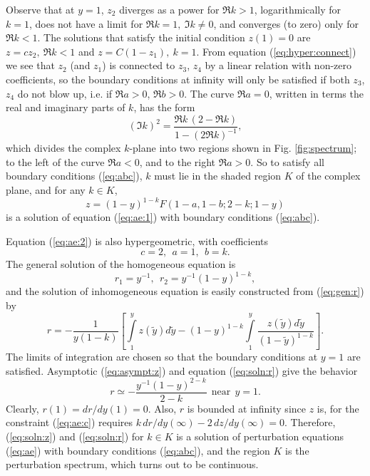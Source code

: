 Observe that at $y=1$, $z_2$ diverges as a power for $\Re k>1$,
logarithmically for $k=1$, does not have a limit for
$\Re k=1,\ \Im k\ne0$, and converges (to zero) only for $\Re k<1$. The
solutions that satisfy the initial condition $z(1)=0$ are
$z=c z_2,\ \Re k<1$ and $z=C(1-z_1),\ k=1$. From equation
(\ref{eq:hyper:connect}) we see that $z_2$ (and $z_1$) is connected to
$z_3$, $z_4$ by a linear relation with non-zero coefficients, so the
boundary conditions at infinity will only be satisfied if both $z_3$,
$z_4$ do not blow up, i.e. if $\Re a>0$, $\Re b>0$. The curve
$\Re a=0$, written in terms the real and imaginary parts of $k$, has
the form
\begin{equation} \label{eq:sep}
  (\Im k)^2 = \frac{\Re k\, (2 - \Re k)}{1 - (2\Re k)^{-1}},
\end{equation}
which divides the complex $k$-plane into two regions shown in Fig.
\ref{fig:spectrum}; to the left of the curve $\Re a<0$, and to the
right $\Re a>0$. So to satisfy all boundary conditions (\ref{eq:abc}),
$k$ must lie in the shaded region $K$ of the complex plane, and for any
$k \in K$,
\begin{equation} \label{eq:soln:z}
  z = (1-y)^{1-k} F(1-a, 1-b; 2-k; 1-y)
\end{equation}
is a solution of equation (\ref{eq:ae:1}) with boundary conditions
(\ref{eq:abc}).

Equation (\ref{eq:ae:2}) is also hypergeometric, with coefficients
\begin{equation} \label{eq:coeff:2}
  c = 2,\ \ a = 1,\ \ b = k.
\end{equation}
The general solution of the homogeneous equation is
\begin{equation} \label{eq:gen:r}
  r_1 = y^{-1},\ \ r_2 = y^{-1} (1-y)^{1-k},
\end{equation}
and the solution of inhomogeneous equation is easily constructed from
(\ref{eq:gen:r}) by
\begin{equation} \label{eq:soln:r}
  r = - \frac{1}{y(1-k)} \left[
    \int\limits_1^y z(\tilde{y}) d\tilde{y} -
    (1-y)^{1-k} \int\limits_1^y
      \frac{z(\tilde{y}) d\tilde{y}}{(1-\tilde{y})^{1-k}}
    \right].
\end{equation}
The limits of integration are chosen so that the boundary conditions at
$y=1$ are satisfied. Asymptotic (\ref{eq:asympt:z}) and equation
(\ref{eq:soln:r}) give the behavior
\begin{equation} \label{eq:asympt:r}
  r \simeq - \frac{y^{-1} (1-y)^{2-k}}{2-k}\ \ \text{near}\ \ y=1.
\end{equation}
Clearly, $r(1)=dr/dy(1)=0$. Also, $r$ is bounded at infinity since $z$
is, for the constraint (\ref{eq:ae:c}) requires
$k\, dr/dy(\infty) - 2\, dz/dy(\infty) = 0$. Therefore,
(\ref{eq:soln:z}) and (\ref{eq:soln:r}) for $k \in K$ is a solution of
perturbation equations (\ref{eq:ae}) with boundary conditions
(\ref{eq:abc}), and the region $K$ is the perturbation spectrum, which
turns out to be continuous.


